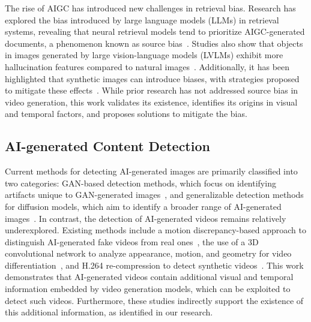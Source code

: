 The rise of AIGC has introduced new challenges in retrieval bias. Research has explored the bias introduced by large language models (LLMs) in retrieval systems, revealing that neural retrieval models tend to prioritize AIGC-generated documents, a phenomenon known as source bias~\cite{dai2023llms}. Studies also show that objects in images generated by large vision-language models (LVLMs) exhibit more hallucination features compared to natural images~\cite{gao2024aigcs}. Additionally, it has been highlighted that synthetic images can introduce biases, with strategies proposed to mitigate these effects~\cite{xu2024invisible}. While prior research has not addressed source bias in video generation, this work validates its existence, identifies its origins in visual and temporal factors, and proposes solutions to mitigate the bias.

\subsection{AI-generated Content Detection}


Current methods for detecting AI-generated images are primarily classified into two categories: GAN-based detection methods, which focus on identifying artifacts unique to GAN-generated images~\cite{wang2020cnn,liu2020global}, and generalizable detection methods for diffusion models, which aim to identify a broader range of AI-generated images~\cite{ma2023exposing,luo2024lare,wu2023generalizable,epstein2023online,wang2023dire,corvi2023detection}. In contrast, the detection of AI-generated videos remains relatively underexplored. Existing methods include a motion discrepancy-based approach to distinguish AI-generated fake videos from real ones~\cite{fei2021exposing}, the use of a 3D convolutional network to analyze appearance, motion, and geometry for video differentiation~\cite{chang2024matters}, and H.264 re-compression to detect synthetic videos~\cite{Vahdati_2024_CVPR}. This work demonstrates that AI-generated videos contain additional visual and temporal information embedded by video generation models, which can be exploited to detect such videos. Furthermore, these studies indirectly support the existence of this additional information, as identified in our research.